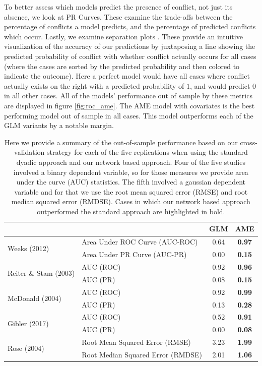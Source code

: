\documentclass[12pt]{amsart}
\begin{document}
To better assess which models predict the presence of conflict, not just its absence, we look at PR Curves. These examine the trade-offs between the percentage of conflicts a model predicts, and the percentage of predicted conflicts which occur. Lastly, we examine separation plots \citep{greenhill:etal:2011}. These provide an intuitive visualization of the accuracy of our predictions by juxtaposing a line showing the predicted probability of conflict with whether conflict actually occurs for all cases (where the cases are sorted by the predicted probability and then colored to indicate the outcome). Here a perfect model would have all cases where conflict actually exists on the right with a predicted probability of $1$, and would predict $0$ in all other cases. All of the models' performance out of sample by these metrics are displayed in figure \ref{fig:roc_ame}. The AME model with covariates is the best performing model out of sample in all cases. This model outperforms each of the GLM variants by a notable margin.

\begin{table}[ht]
\centering
	\begin{tabular}{l|l cc}
	~ & ~ & GLM & AME \\
	\hline\hline
		\multirow{2}{*}{Weeks (2012)} & Area Under ROC Curve (AUC-ROC) & 0.64 & \textbf{0.97} \\
		~ & Area Under PR Curve (AUC-PR) & 0.00 & \textbf{0.15} \\
		\hline
		\multirow{2}{*}{Reiter \& Stam (2003)} & AUC (ROC) & 0.92 & \textbf{0.96} \\
		~ & AUC (PR) & 0.08 & \textbf{0.15} \\
		\hline
		\multirow{2}{*}{McDonald (2004)} & AUC (ROC) & 0.92 & \textbf{0.99} \\
		~ & AUC (PR) & 0.13 & \textbf{0.28} \\
		\hline
		\multirow{2}{*}{Gibler (2017)} & AUC (ROC) & 0.52 & \textbf{0.91} \\
		~ & AUC (PR) & 0.00 & \textbf{0.08} \\
		\hline
		\multirow{2}{*}{Rose (2004)} & Root Mean Squared Error (RMSE) & 3.23 & \textbf{1.99} \\
		~ & Root Median Squared Error (RMDSE) & 2.01 & \textbf{1.06} \\
	\hline\hline
	\end{tabular}
	\caption{Here we provide a summary of the out-of-sample performance based on our cross-validation strategy for each of the five replications when using the standard dyadic approach and our network based approach. Four of the five studies involved a binary dependent variable, so for those measures we provide area under the curve (AUC) statistics. The fifth involved a gaussian dependent variable and for that we use the root mean squared error (RMSE) and root median squared error (RMDSE). Cases in which our network based approach outperformed the standard approach are highlighted in bold.}
	\label{tab:modelPerfSumm}
\end{table}
\FloatBarrier
\end{document}
